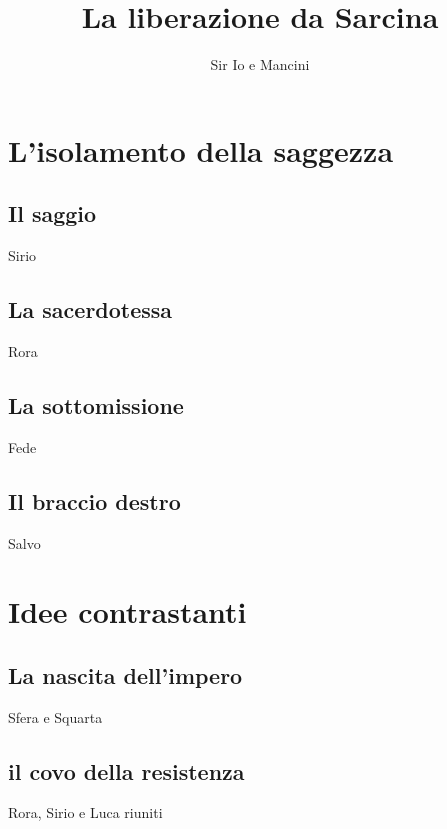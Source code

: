 \documentclass{book}
\title{La liberazione da Sarcina}
\author{Sir Io e Mancini}
\date{}
\begin{document}
\maketitle
\tableofcontents

  
\chapter{L'isolamento della saggezza}
\section{Il saggio}
Sirio
\section{La sacerdotessa}
Rora
\section{La sottomissione}
Fede
\section{Il braccio destro}
Salvo
\chapter{Idee contrastanti}
\section{La nascita dell'impero}
Sfera e Squarta
\section{il covo della resistenza}
Rora, Sirio e Luca riuniti
\end{document}
